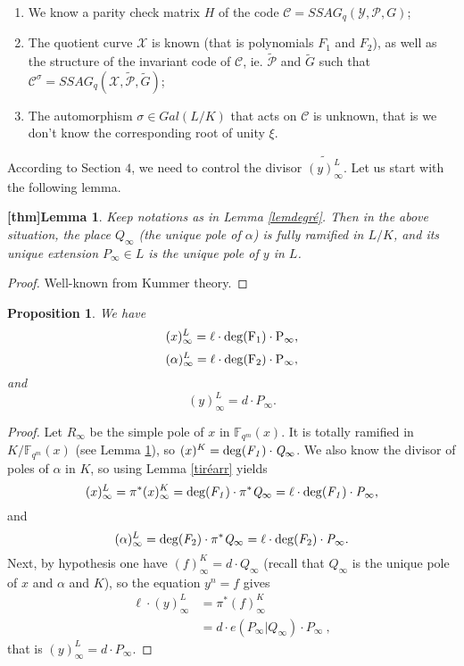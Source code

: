\documentclass[10pt]{article}
\newtheorem{prop1}[thm]{Proposition}
\newtheorem{lem1}{[thm]Lemma}
\newcommand{\s}{\vspace{0.3cm}}
\newcommand{\cd}{\cdot}
\newcommand{\fqm}{\mathbb{F}_{q^m}}
\newcommand{\X}{\mathcal{X}}
\newcommand{\Y}{\mathcal{Y}}
\newcommand{\PR}{\mathcal{P}}
\begin{document}
\s

\begin{enumerate}
\item We know a parity check matrix $H$ of the code $\mathcal{C} = SSAG_q(\Y,\PR,G)$;
\item The quotient curve $\X$ is known (that is polynomials $F_1$ and $F_2$), as well as the structure of the invariant code of $\mathcal{C}$, ie. $\tilde{\PR}$ and $\tilde{G}$ such that $\mathcal{C}^{\sigma} = SSAG_q(\X,\tilde{\PR},\tilde{G})$;
\item The automorphism $\sigma \in Gal(L/K)$ that acts on $\mathcal{C}$ is unknown, that is we don't know the corresponding root of unity $\xi$.
\end{enumerate}

\s


According to Section $4$, we need to control the divisor $\widetilde{(y)^L_{\infty}}$. Let us start with the following lemma.

\s

\begin{lem1} \label{ramification}
Keep notations as in Lemma \ref{lemdegré}. Then in the above situation, the place $Q_{\infty}$ (the unique pole of $\alpha$) is fully ramified in $L/K$, and its unique extension $P_{\infty} \in L$ is the unique pole of $y$ in $L$. 
\end{lem1}

\s

\begin{proof}
Well-known from Kummer theory.
\end{proof}

\s

\begin{prop1} \label{propclé}
We have
\[(x)^L_{\infty} = \ell \cd \rm{deg}(F_1) \cd P_{\infty},\]
\[(\alpha)^L_{\infty} = \ell \cd \rm{deg}(F_2) \cd P_{\infty},\]
and
\[(y)^L_{\infty} = d \cd P_{\infty}.\]
\end{prop1}

\s

\begin{proof}
Let $R_{\infty}$ be the simple pole of $x$ in $\fqm(x)$. It is totally ramified in $K/\fqm(x)$ (see Lemma \ref{ramification}), so $(x)^K = \rm{deg}\it(F_1) \cd Q_{\infty}$. We also know the divisor of poles of $\alpha$ in $K$, so using Lemma \ref{tiréarr} yields
\[(x)^L_{\infty} = \pi^*(x)^K_{\infty} = \rm{deg}\it(F_1) \cd \pi^*Q_{\infty} = \ell \cd \rm{deg}\it(F_1) \cd P_{\infty},\]
and
\[(\alpha)^L_{\infty} = \rm{deg}\it(F_{\rm 2}) \cd \pi^*Q_{\infty} = \ell \cd \rm{deg}\it(F_{\rm 2}) \cd P_{\infty}.\]
Next, by hypothesis one have $(f)^K_{\infty} = d \cd Q_{\infty}$ (recall that $Q_{\infty}$ is the unique pole of $x$ and $\alpha$ and $K$), so the equation $y^n=f$ gives
\begin{align*} \ell \cd (y)^L_{\infty} &= \pi^*(f)^K_{\infty} \\
&= d \cd e(P_{\infty}|Q_{\infty}) \cd P_{\infty} \ ,
\end{align*}
that is $(y)^L_{\infty} = d \cd P_{\infty}.$
\end{proof}
\end{document}
